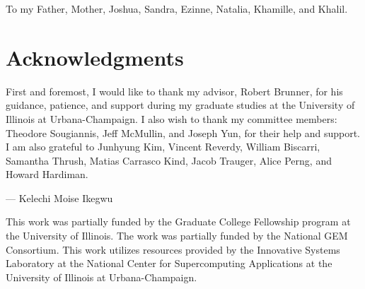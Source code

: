 \documentclass[12pt,edeposit,fullpage]{uiucthesis2014}
\newcommand\RC[1]{\color{red}{\textbf{ Robert Comment: }{#1} }\color{black}}
\begin{document}
\begin{dedication}
To my Father,  Mother,  Joshua,  Sandra,  Ezinne,  Natalia,  Khamille,  and Khalil.
\end{dedication}

\chapter*{Acknowledgments}


First and foremost, I would like to thank my advisor,  Robert Brunner, for his guidance,  patience,  and support during my graduate studies at the University of Illinois at Urbana-Champaign.
I also wish to thank my committee members: Theodore Sougiannis, Jeff McMullin, and Joseph Yun,  for their help and support.
I am also grateful to Junhyung Kim, Vincent Reverdy, William Biscarri,  Samantha Thrush,  Matias Carrasco Kind,  Jacob Trauger,  Alice Perng, and Howard Hardiman.

\begin{flushright}
--- Kelechi Moise Ikegwu
\end{flushright}

\vspace{10mm}

This work was partially funded by the Graduate College Fellowship program at the University of Illinois.  The work was partially funded by the National GEM Consortium.  This work utilizes resources provided by the Innovative Systems Laboratory at the National Center for Supercomputing Applications at the University of Illinois at Urbana-Champaign.

\end{document}
